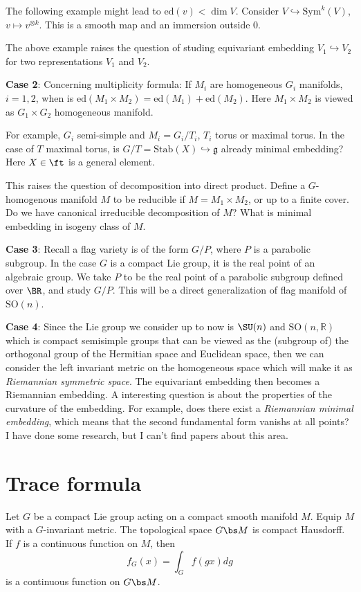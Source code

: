 \documentclass[a4paper]{amsart}
\newcommand{\fg}{{\mathfrak{g}}} \newcommand{\fh}{{\mathfrak{h}}}
\newcommand{\ed}{\mathrm{ed}}
\newcommand{\SO}{{\mathrm{SO}}}\newcommand{\so}{\mathfrak{so}}
\newcommand{\Sym}{{\mathrm{Sym}}}\newcommand{\sgn}{{\mathrm{sgn}}}
\newcommand{\Stab}{{\mathrm{Stab}}}\newcommand{\Symb}{{\mathrm{Symb}}}\newcommand{\MS}{{\mathrm{MS}}}
\newcommand{\incl}{\hookrightarrow}
\theoremstyle{plain}
\theoremstyle{remark} \newtheorem{remark}[thm]{Remark}
\theoremstyle{remark} \newtheorem{exercise}{Exercise}
\theoremstyle{remark} \newtheorem{example}{Example}
\numberwithin{equation}{section}
\begin{document}
The following example might lead to $\ed(v)<\dim V$. Consider $V\incl\Sym^k(V)$, $v\mapsto v^{\otimes k}$. This is a smooth map and an immersion outside $0$.

The above example raises the question of studing equivariant embedding $V_1\incl V_2$ for two representations $V_1$ and $V_2$.

\textbf{Case 2}: Concerning multiplicity formula: If $M_i$ are homogeneous $G_i$ manifolds, $i=1,2$, when is $\ed(M_1\times M_2)=\ed(M_1)+\ed(M_2)$. Here $M_1\times M_2$ is viewed as $G_1\times G_2$ homogeneous manifold.

For example, $G_i$ semi-simple and $M_i=G_i/T_i$, $T_i$ torus or maximal torus. In the case of $T$ maximal torus, is $G/T=\Stab(X)\incl \fg$ already minimal embedding? Here $X\in\ft$ is a general element.

This raises the question of decomposition into direct product. Define a $G$-homogenous manifold $M$ to be reducible if $M=M_1\times M_2$, or up to a finite cover. Do we have canonical irreducible decomposition of $M$? What is minimal embedding in isogeny class of $M$.

\textbf{Case 3}: Recall a flag variety is of the form $G/P$, where $P$ is a parabolic subgroup. In the case $G$ is a compact Lie group, it is the real point of an algebraic group. We take $P$ to be the real point of a parabolic subgroup defined over $\BR$, and study $G/P$. This will be a direct generalization of flag manifold of $\SO(n)$.

\textbf{Case 4}: Since the Lie group we consider up to now is $\SU(n)$ and $\SO(n,\mathbb{R})$ which is compact semisimple groups that can be viewed as the (subgroup of) the orthogonal group of the Hermitian space and Euclidean space, then we can consider the left invariant metric on the homogeneous space which will make it as \emph{Riemannian symmetric space}. The equivariant embedding then becomes a Riemannian embedding. A interesting question is about the properties of the curvature of the embedding. For example, does there exist a \emph{Riemannian minimal embedding}, which means that the second fundamental form vanishs at all points?  I have done some research, but I can't find papers about this area. 



\section{Trace formula}

Let $G$ be a compact Lie group acting on a compact smooth manifold $M$. Equip $M$ with a $G$-invariant metric. The topological space $G\bs M$ is compact Hausdorff. If $f$ is a continuous function on $M$, then
\[f_G(x)=\int_G f(gx)dg\]
is a continuous function on $G\bs M$.
\end{document}
